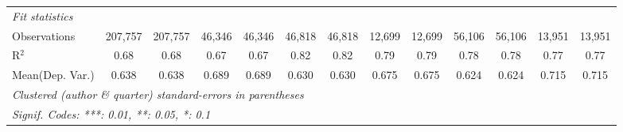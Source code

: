 \begin{tabular}{lcccccccccccc}
   \midrule
   \emph{Fit statistics}\\
   Observations                             & 207,757       & 207,757       & 46,346      & 46,346  & 46,818      & 46,818         & 12,699       & 12,699         & 56,106       & 56,106       & 13,951      & 13,951\\  
   R$^2$                                    & 0.68          & 0.68          & 0.67        & 0.67    & 0.82        & 0.82           & 0.79         & 0.79           & 0.78         & 0.78         & 0.77        & 0.77\\  
Mean(Dep. Var.) & 0.638 & 0.638 & 0.689 & 0.689 & 0.630 & 0.630 & 0.675 & 0.675 & 0.624 & 0.624 & 0.715 & 0.715 \\
   \midrule \midrule
   \multicolumn{13}{l}{\emph{Clustered (author \& quarter) standard-errors in parentheses}}\\
   \multicolumn{13}{l}{\emph{Signif. Codes: ***: 0.01, **: 0.05, *: 0.1}}\\
\end{tabular}
\par\endgroup

